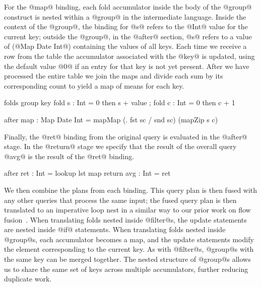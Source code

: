 For the @map@ binding, each fold accumulator inside the body of the @group@ construct is nested within a @group@ in the intermediate language.
Inside the context of the @group@, the binding for @s@ refers to the @Int@ value for the current key; outside the @group@, in the @after@ section, @s@ refers to a value of (@Map Date Int@) containing the values of all keys.
Each time we receive a row from the table the accumulator associated with the @key@ is updated, using the default value @0@ if an entry for that key is not yet present.
After we have processed the entire table we join the maps and divide each sum by its corresponding count to yield a map of means for each key.
\begin{icicle-core}
folds  { group key
          { fold s : Int = 0 then s + value
          ; fold c : Int = 0 then c + 1 } }

after  { map : Map Date Int
          = mapMap (\sc. fst sc / snd sc) (mapZip s c) }
\end{icicle-core}


Finally, the @ret@ binding from the original query is evaluated in the @after@ stage. In the @return@ stage we specify that the result of the overall query @avg@ is the result of the @ret@ binding.
\begin{icicle-core}
  after  { ret : Int = lookup lst map }
  return { avg : Int = ret }
\end{icicle-core}


We then combine the plans from each binding.
This query plan is then fused with any other queries that process the same input; the fused query plan is then translated to an imperative loop nest in a similar way to our prior work on flow fusion~\cite{lippmeier2013data}.
When translating folds nested inside @filter@s, the update statements are nested inside @if@ statements.
When translating folds nested inside @group@s, each accumulator becomes a map, and the update statements modify the element corresponding to the current key.
As with @filter@s, @group@s with the same key can be merged together.
The nested structure of @group@s allows us to share the same set of keys across multiple accumulators, further reducing duplicate work.

